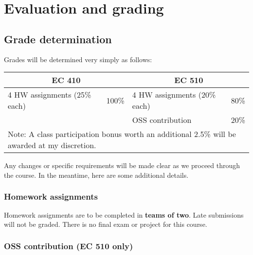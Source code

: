 \documentclass[12]{article}
\begin{document}
\section*{Evaluation and grading}

\subsection*{Grade determination}


Grades will be determined very simply as follows:

\begin{table}[!h] \centering 
	\label{tab:grades} 
	\begin{tabularx}{0.9\textwidth}{Xr|Xr} 
		\toprule
		\multicolumn{2}{c}{EC 410}	& \multicolumn{2}{c}{EC 510}  \\
		\midrule
		4 \times HW assignments (25\% each) & 100\%	& 4 \times HW assignments (20\% each) 	& 80\% \\
											& 		& OSS contribution						& 20\% \\
		\bottomrule
		\multicolumn{4}{l}{\footnotesize Note: A class participation bonus worth an additional 2.5\% will be awarded at my discretion.} \\
	\end{tabularx} 
\end{table} 

Any changes or specific requirements will be made clear as we proceed through the course. In the meantime, here are some additional details.

\vspace{-0.25cm}
\subsubsection*{Homework assignments}

Homework assignments are to be completed in \textbf{teams of two}. Late submissions will not be graded. There is no final exam or project for this course.

\vspace{-0.25cm}
\subsubsection*{OSS contribution (EC 510 only)}
\end{document}
